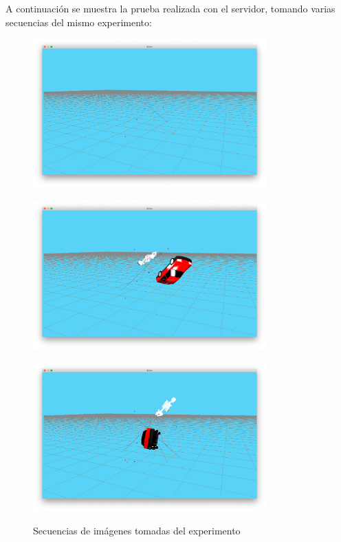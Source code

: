 A continuación se muestra la prueba realizada con el servidor, tomando varias secuencias del mismo experimento:

\begin{figure}[H]
  \begin{center}
    \includegraphics[width=0.8\textwidth]{figures/test3dviz1.png}
		\label{fig.test3dviz1}
		\end{center}
\end{figure}
\begin{figure}[H]
  \begin{center}
    \includegraphics[width=0.8\textwidth]{figures/test3dviz2.png}
		\label{fig.test3dviz2}
		\end{center}
\end{figure}
\begin{figure}[H]
  \begin{center}
    \includegraphics[width=0.8\textwidth]{figures/test3dviz3.png}
		\label{fig.test3dviz3}
		\caption{Secuencias de imágenes tomadas del experimento}
		\end{center}
\end{figure}
